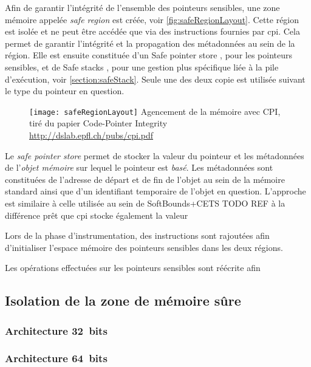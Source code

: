 Afin de garantir l'intégrité de l'ensemble des pointeurs sensibles, une zone mémoire appelée \textit{safe region} est créée, voir \autoref{fig:safeRegionLayout}. Cette région est isolée et ne peut être accédée que via des instructions fournies par \gls{cpi}. Cela permet de garantir l'intégrité et la propagation des métadonnées au sein de la région. Elle est ensuite constituée d'un \og Safe pointer store \fg, pour les pointeurs sensibles, et de \og Safe stacks \fg, pour une gestion plus spécifique liée à la pile d'exécution, voir \autoref{section:safeStack}. Seule une des deux copie est utilisée suivant le type du pointeur en question.

\begin{figure}[H]
	\centering
	\texttt{[image: safeRegionLayout]}
	{Agencement de la mémoire avec CPI, tiré du papier Code-Pointer Integrity}
	{\url{http://dslab.epfl.ch/pubs/cpi.pdf}}
	\label{fig:safeRegionLayout}
\end{figure}

Le \textit{safe pointer store} permet de stocker la valeur du pointeur et les métadonnées de l'\textit{objet mémoire} sur lequel le pointeur est \textit{basé}. Les métadonnées sont constituées de l'adresse de départ et de fin de l'objet au sein de la mémoire standard ainsi que d'un identifiant temporaire de l'objet en question. L'approche est similaire à celle utilisée au sein de SoftBounds+CETS TODO REF à la différence prêt que \gls{cpi} stocke également la valeur



Lors de la phase d'instrumentation, des instructions sont rajoutées afin d'initialiser l'espace mémoire des pointeurs sensibles dans les deux régions.


 Les opérations effectuées sur les pointeurs sensibles sont réécrite afin

\subsection{Isolation de la zone de mémoire sûre}


\subsubsection{Architecture 32~bits}
\subsubsection{Architecture 64~bits}


